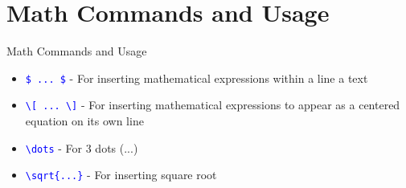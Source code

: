 \documentclass{beamer}
\begin{document}
	\section{Math Commands and Usage}
	\begin{frame}{Math Commands and Usage}
		\begin{itemize}
			\item \texttt{\textcolor{blue}{\$ ... \$}} - For inserting mathematical expressions within a line a text \\ [10pt]
			\item \texttt{\textcolor{blue}{\textbackslash[ ... \textbackslash]}} - For inserting mathematical expressions to appear as a centered equation on its own line
			\item \texttt{\textcolor{blue}{\textbackslash dots}} - For 3 dots (...)
			\item \texttt{\textcolor{blue}{\textbackslash sqrt\{...\}}} - For inserting square root
		\end{itemize}
		
	\end{frame}
\end{document}
